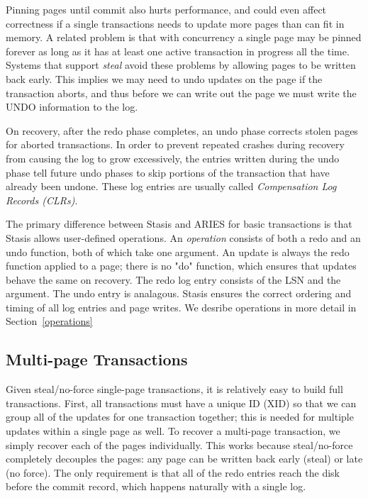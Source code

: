 \documentclass[letterpaper,twocolumn,10pt]{article}
\newcommand{\yad}{Stasis\xspace}
\begin{document}
Pinning pages until commit also hurts performance, and could even
affect correctness if a single transactions needs to update more pages
than can fit in memory. A related problem is that with concurrency a
single page may be pinned forever as long as it has at least one
active transaction in progress all the time.  Systems that support
{\em steal} avoid these problems by allowing pages to be written back
early.  This implies we may need to undo updates on the page if the
transaction aborts, and thus before we can write out the page we must
write the UNDO information to the log. 

On recovery, after the redo phase completes, an undo phase corrects
stolen pages for aborted transactions.  In order to prevent repeated
crashes during recovery from causing the log to grow excessively, the
entries written during the undo phase tell future undo phases to skip
portions of the transaction that have already been undone.  These log
entries are usually called {\em Compensation Log Records (CLRs)}.


The primary difference between \yad and ARIES for basic transactions
is that \yad allows user-defined operations.  An {\em operation}
consists of both a redo and an undo function, both of which take one
argument. An update is always the redo function applied to a page;
there is no "do" function, which ensures that updates behave the same
on recovery.  The redo log entry consists of the LSN and the argument.
The undo entry is analagous.  \yad ensures the correct ordering and
timing of all log entries and page writes.  We desribe operations in
more detail in Section~\ref{operations}


\subsection{Multi-page Transactions}

Given steal/no-force single-page transactions, it is relatively easy
to build full transactions. First, all transactions must have a unique
ID (XID) so that we can group all of the updates for one transaction
together; this is needed for multiple updates within a single page as
well.  To recover a multi-page transaction, we simply recover each of
the pages individually.  This works because steal/no-force completely
decouples the pages: any page can be written back early (steal) or
late (no force).  The only requirement is that all of the redo entries
reach the disk before the commit record, which happens naturally with
a single log.
\end{document}
